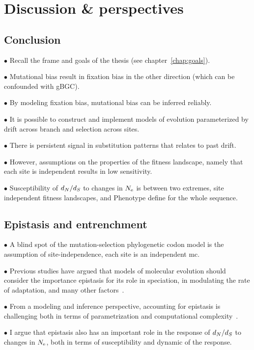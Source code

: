 \chapter{Discussion \& perspectives}
{
\hypersetup{linkcolor=GREYDARK}
\minitoc
}

\section{Conclusion}

$\bullet$ Recall the frame and goals of the thesis (see chapter~\ref{chap:goals}).

$\bullet$ Mutational bias result in fixation bias in the other direction (which can be confounded with gBGC).

$\bullet$ By modeling fixation bias, mutational bias can be inferred reliably.

$\bullet$ It is possible to construct and implement models of evolution parameterized by drift across branch and selection across sites.

$\bullet$ There is persistent signal in \gls{substitution} patterns that relates to past drift.

$\bullet$ However, assumptions on the properties of the fitness landscape, namely that each site is independent results in low sensitivity.

$\bullet$ Susceptibility of $d_N / d_S$ to changes in $N_{\textrm{e}}$ is between two extremes, site independent fitness landscapes, and \gls{Phenotype} define for the whole sequence.

\section{Epistasis and entrenchment}

$\bullet$ A blind spot of the mutation-selection phylogenetic \gls{codon} model is the assumption of site-independence, each site is an independent \gls{mc}.

$\bullet$ Previous studies have argued that models of molecular evolution should consider the importance epistasis for its role in speciation, in modulating the rate of adaptation, and many other factors~\citep{Goldstein2017, Miller2018}.

$\bullet$ From a modeling and inference perspective, accounting for epistasis is challenging both in terms of parametrization and computational complexity~\citep{Rodrigue2005, Manhart2014}.

$\bullet$ I argue that epistasis also has an important role in the response of $d_N / d_S$ to changes in $N_{\textrm{e}}$, both in terms of susceptibility and dynamic of the response.

